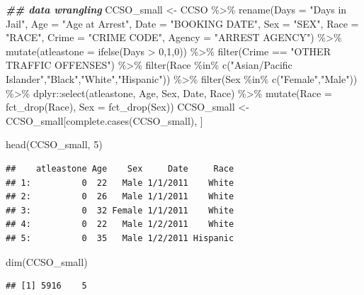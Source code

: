 \documentclass[
  ignorenonframetext,
]{beamer}
\newenvironment{Shaded}{\begin{snugshade}}{\end{snugshade}}
\newcommand{\AttributeTok}[1]{\textcolor[rgb]{0.77,0.63,0.00}{#1}}
\newcommand{\DecValTok}[1]{\textcolor[rgb]{0.00,0.00,0.81}{#1}}
\newcommand{\DocumentationTok}[1]{\textcolor[rgb]{0.56,0.35,0.01}{\textbf{\textit{#1}}}}
\newcommand{\FunctionTok}[1]{\textcolor[rgb]{0.00,0.00,0.00}{#1}}
\newcommand{\NormalTok}[1]{#1}
\newcommand{\OtherTok}[1]{\textcolor[rgb]{0.56,0.35,0.01}{#1}}
\newcommand{\SpecialCharTok}[1]{\textcolor[rgb]{0.00,0.00,0.00}{#1}}
\newcommand{\StringTok}[1]{\textcolor[rgb]{0.31,0.60,0.02}{#1}}
\begin{document}
\begin{frame}[fragile]{}
\begin{Shaded}
\begin{Highlighting}[]
\DocumentationTok{\#\# data wrangling}
\NormalTok{CCSO\_small }\OtherTok{\textless{}{-}}\NormalTok{ CCSO }\SpecialCharTok{\%\textgreater{}\%} \FunctionTok{rename}\NormalTok{(}\AttributeTok{Days =} \StringTok{"Days in Jail"}\NormalTok{, }\AttributeTok{Age =} \StringTok{"Age at Arrest"}\NormalTok{, }
                        \AttributeTok{Date =} \StringTok{"BOOKING DATE"}\NormalTok{, }\AttributeTok{Sex =} \StringTok{"SEX"}\NormalTok{, }\AttributeTok{Race =} \StringTok{"RACE"}\NormalTok{,}
                        \AttributeTok{Crime =} \StringTok{"CRIME CODE"}\NormalTok{, }\AttributeTok{Agency =} \StringTok{"ARREST AGENCY"}\NormalTok{) }\SpecialCharTok{\%\textgreater{}\%} 
  \FunctionTok{mutate}\NormalTok{(}\AttributeTok{atleastone =} \FunctionTok{ifelse}\NormalTok{(Days }\SpecialCharTok{\textgreater{}} \DecValTok{0}\NormalTok{,}\DecValTok{1}\NormalTok{,}\DecValTok{0}\NormalTok{)) }\SpecialCharTok{\%\textgreater{}\%} 
  \FunctionTok{filter}\NormalTok{(Crime }\SpecialCharTok{==} \StringTok{"OTHER TRAFFIC OFFENSES"}\NormalTok{) }\SpecialCharTok{\%\textgreater{}\%}  
  \FunctionTok{filter}\NormalTok{(Race }\SpecialCharTok{\%in\%} \FunctionTok{c}\NormalTok{(}\StringTok{"Asian/Pacific Islander"}\NormalTok{,}\StringTok{"Black"}\NormalTok{,}\StringTok{"White"}\NormalTok{,}\StringTok{"Hispanic"}\NormalTok{)) }\SpecialCharTok{\%\textgreater{}\%} 
  \FunctionTok{filter}\NormalTok{(Sex }\SpecialCharTok{\%in\%} \FunctionTok{c}\NormalTok{(}\StringTok{"Female"}\NormalTok{,}\StringTok{"Male"}\NormalTok{)) }\SpecialCharTok{\%\textgreater{}\%} 
\NormalTok{  dplyr}\SpecialCharTok{::}\FunctionTok{select}\NormalTok{(atleastone, Age, Sex, Date, Race) }\SpecialCharTok{\%\textgreater{}\%}  
  \FunctionTok{mutate}\NormalTok{(}\AttributeTok{Race =} \FunctionTok{fct\_drop}\NormalTok{(Race), }\AttributeTok{Sex =} \FunctionTok{fct\_drop}\NormalTok{(Sex))}
\NormalTok{CCSO\_small }\OtherTok{\textless{}{-}}\NormalTok{ CCSO\_small[}\FunctionTok{complete.cases}\NormalTok{(CCSO\_small), ]}

\FunctionTok{head}\NormalTok{(CCSO\_small, }\DecValTok{5}\NormalTok{)}
\end{Highlighting}
\end{Shaded}

\begin{verbatim}
##    atleastone Age    Sex     Date     Race
## 1:          0  22   Male 1/1/2011    White
## 2:          0  26   Male 1/1/2011    White
## 3:          0  32 Female 1/1/2011    White
## 4:          0  22   Male 1/2/2011    White
## 5:          0  35   Male 1/2/2011 Hispanic
\end{verbatim}

\begin{Shaded}
\begin{Highlighting}[]
\FunctionTok{dim}\NormalTok{(CCSO\_small)}
\end{Highlighting}
\end{Shaded}

\begin{verbatim}
## [1] 5916    5
\end{verbatim}
\end{frame}
\end{document}

